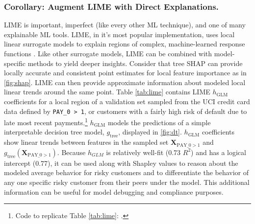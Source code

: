 \documentclass{article}
\begin{document}
\subsubsection{Corollary: Augment LIME with Direct Explanations.} LIME is important, imperfect (like every other ML technique), and one of many explainable ML tools. LIME, in it's most popular implementation, uses local linear surrogate models to explain regions of complex, machine-learned response functions \cite{lime}. Like other surrogate models, LIME can be combined with model-specific methods to yield deeper insights. Consider that tree SHAP can provide locally accurate and consistent point estimates for local feature importance as in \ref{fig:shap}. LIME can then provide approximate information about modeled local linear trends around the same point. Table \ref{tab:lime} contains LIME $h_{\text{GLM}}$ coefficients for a local region of a validation set sampled from the UCI credit card data defined by \texttt{PAY\_0 > 1}, or customers with a fairly high risk of default due to late most recent payments.\footnote{Code to replicate Table \ref{tab:lime}: \url{}.} $h_{\text{GLM}}$ models the predictions of a simple interpretable decision tree model, $g_{\text{tree}}$, displayed in \ref{fig:dt}. $h_{\text{GLM}}$ coefficients show linear trends between features in the sampled set $\mathbf{X}_{\text{PAY\_0} > 1}$ and $g_{\text{tree}}(\mathbf{X}_{\text{PAY\_0}> 1})$. Because $h_{GLM}$ is relatively well-fit (0.73 $R^2$) and has a logical intercept (0.77), it can be used along with Shapley values to reason about the modeled average behavior for risky customers and to differentiate the behavior of any one specific risky customer from their peers under the model. This additional information can be useful for model debugging and compliance purposes.
\end{document}
